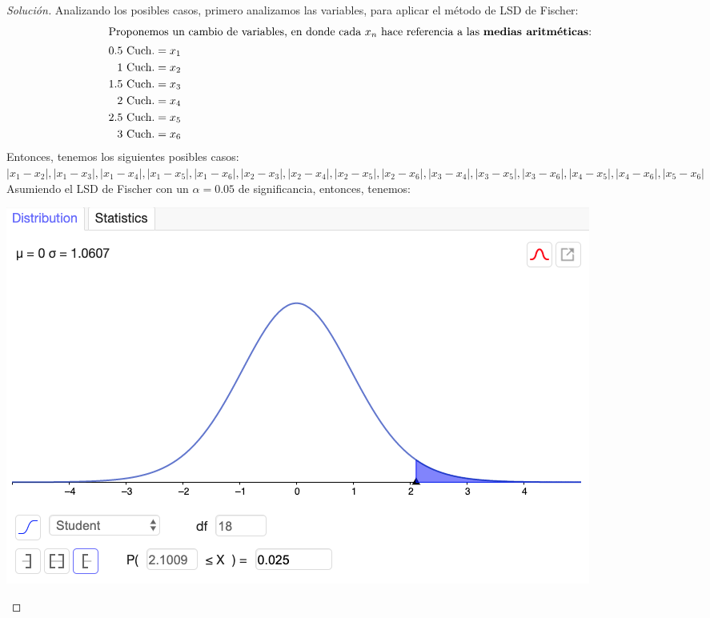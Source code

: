 \documentclass[a4paper,12pt]{article}
\newenvironment{solution}
  {\renewcommand\qedsymbol{$\blacksquare$}\begin{proof}[Solución]}
  {\end{proof}}
\begin{document}
\begin{solution}
   Analizando los posibles casos, primero analizamos las variables, para aplicar el método de LSD de Fischer:
   \begin{align}
       \intertext{Proponemos un cambio de variables, en donde cada $x_n$ hace referencia a las \textbf{medias aritméticas}:}
       \text{0.5 Cuch.} &= x_1\\
       \text{1 Cuch.}   &= x_2\\
       \text{1.5 Cuch.} &= x_3\\
       \text{2 Cuch.}   &= x_4\\
       \text{2.5 Cuch.} &= x_5\\
       \text{3 Cuch.}   &= x_6
   \end{align}
   Entonces, tenemos los siguientes posibles casos: $|x_1-x_2|, |x_1-x_3|, |x_1-x_4|, |x_1-x_5|, |x_1-x_6|, |x_2-x_3|, |x_2-x_4|, |x_2-x_5|, |x_2-x_6|, |x_3 -x_4|, |x_3 -x_5|, |x_3-x_6|, |x_4-x_5|, |x_4-x_6|, |x_5-x_6|$\newline\newline 
   Asumiendo el LSD de Fischer con un $\alpha=0.05$ de significancia, entonces, tenemos: 
   \begin{center}
       \includegraphics[scale=0.5]{Imagenes/t-student.png}
   \end{center}


\end{solution}
\end{document}
